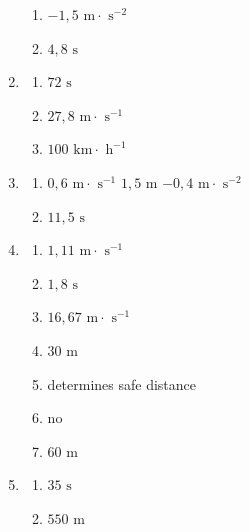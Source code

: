\begin{multicols}{3}
\begin{enumerate}[noitemsep, label=\textbf{(\arabic*)} ]
\begin{enumerate}[noitemsep, label=\textbf{(\alph*)} ]
 \item $-1,5 \text{ m} \cdot \text{ s}^{-2}$
\item $4,8 \text{ s}$
\end{enumerate}
\item 
\begin{enumerate}[noitemsep, label=\textbf{(\alph*)} ]
 \item $72 \text{ s}$
\item $27,8 \text{ m} \cdot \text{ s}^{-1}$
\item $100 \text{ km} \cdot \text{ h}^{-1}$
\end{enumerate}
\item 
\begin{enumerate}[noitemsep, label=\textbf{(\alph*)} ]
 \item $0,6 \text{ m} \cdot \text{ s}^{-1}$ $1,5 \text{ m}$ $-0,4 \text{ m} \cdot \text{ s}^{-2}$
\item $11,5 \text{ s}$
\end{enumerate}
\item 
\begin{enumerate}[noitemsep, label=\textbf{(\alph*)} ]
 \item $1,11 \text{ m} \cdot \text{ s}^{-1}$
\item $1,8 \text{ s}$
\item $16,67 \text{ m} \cdot \text{ s}^{-1}$
\item $30 \text{ m}$
 \item determines safe distance
\item no
\item $60 \text{ m}$
\end{enumerate}
\item 
\begin{enumerate}[noitemsep, label=\textbf{(\alph*)} ]
 \item $35 \text{ s}$
\item $550 \text{ m}$
\end{enumerate}
 \end{enumerate}
\end{multicols}

